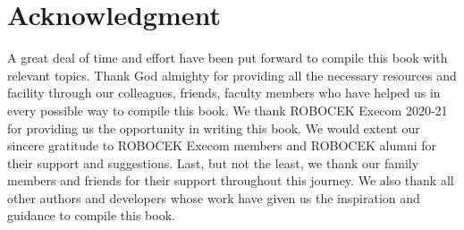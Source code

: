 \chapter*{Acknowledgment}
\begin{fullwidth}
	\begin{doublespace}
		\justify
		\par A great deal of time and effort have been put forward to compile this book with relevant topics. Thank God almighty for providing all the necessary resources and facility through our colleagues, friends, faculty members who have helped us in every possible way to compile this book. We thank ROBOCEK Execom 2020-21 for providing us the opportunity in writing this book. We would extent our sincere gratitude to ROBOCEK Execom members and ROBOCEK alumni for their support and suggestions. Last, but not the least, we thank our family members and friends for their support throughout this journey. We also thank all other authors and developers whose work have given us the inspiration and guidance to compile this book.
	\end{doublespace}
\end{fullwidth}